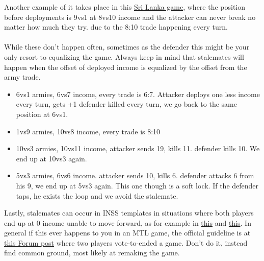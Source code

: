 Another example of it takes place in this \href{https://www.warzone.com/MultiPlayer?GameID=12851727}{Sri Lanka game}, where the position before deployments is 9vs1 at 8vs10 income and the attacker can never break no matter how much they try. due to the 8:10 trade happening every turn.
\\
\\
While these don't happen often, sometimes as the defender this might be your only resort to equalizing the game. Always keep in mind that stalemates will happen when the offset of deployed income is equalized by the offset from the army trade.
\begin{itemize}
    \item 6vs1 armies, 6vs7 income, every trade is 6:7. Attacker deploys one less income every turn, gets +1 defender killed every turn, we go back to the same position at 6vs1.
    \item 1vs9 armies, 10vs8 income, every trade is 8:10
    \item 10vs3 armies, 10vs11 income, attacker sends 19, kills 11. defender kills 10. We end up at 10vs3 again.
    \item 5vs3 armies, 6vs6 income. attacker sends 10, kills 6. defender attacks 6 from his 9, we end up at 5vs3 again. This one though is a soft lock. If the defender taps, he exists the loop and we avoid the stalemate.
\end{itemize}

Lastly, stalemates can occur in INSS templates in situations where both players end up at 0 income unable to move forward, as for example in \href{https://www.warzone.com/MultiPlayer?GameID=33412724}{this} and \href{https://www.warzone.com/MultiPlayer?GameID=17799177}{this}. In general if this ever happens to you in an MTL game, the official guideline is at \href{https://www.warzone.com/Forum/734956-join-multitemplate-ladder-mtl?Offset=44}{this Forum post} where two players vote-to-ended a game. Don't do it, instead find common ground, most likely at remaking the game.
